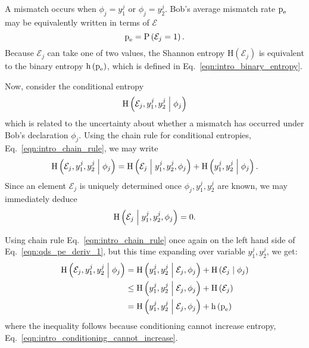 A mismatch occurs when $\phi_j = y_1^j$ or $\phi_j = y_2^j$. Bob's average mismatch rate $\text{p}_{\text{e}}$ may be equivalently written in terms of $\mathcal{E}$
\begin{equation}
\text{p}_{\text{e}} = \text{P}\left(\mathcal{E}_j = 1\right). \notag
\end{equation}
Because $\mathcal{E}_j$ can take one of two values, the Shannon entropy $\text{H}\left(\mathcal{E}_j\right)$ is equivalent to the binary entropy $\text{h}\left(\text{p}_{\text{e}}\right)$, which is defined in Eq.~\ref{eqn:intro_binary_entropy}. %

Now, consider the conditional entropy
\begin{equation}\label{eqn:qds_starting_point}
\text{H}\left(\mathcal{E}_j, y_1^j, y_2^j \; \middle| \; \phi_j\right)
\end{equation}
which is related to the uncertainty about whether a mismatch has occurred under Bob's declaration $\phi_j$. Using the chain rule for conditional entropies, Eq.~\ref{eqn:intro_chain_rule}, we may write
\begin{equation}\label{eqn:qds_pe_deriv_1}
\text{H}\left( \mathcal{E}_j, y_1^j, y_2^j \; \middle| \; \phi_j \right) = 
\text{H}\left( \mathcal{E}_j \; \middle| \; y_1^j, y_2^j, \phi_j\right) + 
\text{H}\left( y_1^j, y_2^j \; \middle| \; \phi_j\right).
\end{equation}
Since an element $\mathcal{E}_j$ is uniquely determined once $\phi_j, y_1^j, y_2^j$ are known, we may immediately deduce
\begin{equation}
\text{H}\left( \mathcal{E}_j \; \middle| \; y_1^j, y_2^j, \phi_j\right) = 0. \notag
\end{equation}

\noindent Using chain rule Eq.~\ref{eqn:intro_chain_rule} once again on the left hand side of Eq.~\ref{eqn:qds_pe_deriv_1}, but this time expanding over variable $y_1^j, y_2^j$, we get:
\begin{align}\label{eqn:qds_pe_deriv_2}
\text{H}\left( \mathcal{E}_j, y_1^j, y_2^j \; \middle| \; \phi_j \right) &=
\text{H}\left(y_1^j, y_2^j \; \middle| \; \mathcal{E}_j, \phi_j\right) + \text{H}\left(\mathcal{E}_j \; \middle| \; \phi_j\right) \notag \\
&\le \text{H}\left(y_1^j, y_2^j \; \middle| \; \mathcal{E}_j, \phi_j\right) + \text{H}\left(\mathcal{E}_j\right) \notag \\
&= \text{H}\left(y_1^j, y_2^j \; \middle| \; \mathcal{E}_j, \phi_j\right) + \text{h}\left(\text{p}_{\text{e}}\right)
\end{align}
where the inequality follows because conditioning cannot increase entropy, Eq.~\ref{eqn:intro_conditioning_cannot_increase}.

